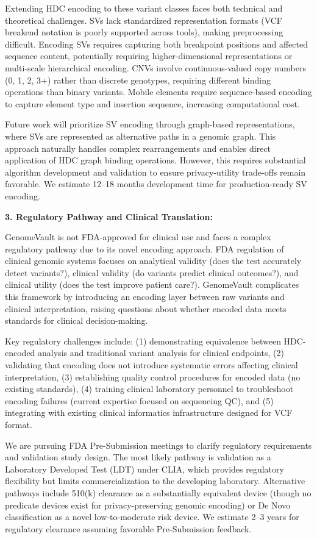 \documentclass[11pt,letterpaper]{article}
\begin{document}
Extending HDC encoding to these variant classes faces both technical and theoretical challenges. SVs lack standardized representation formats (VCF breakend notation is poorly supported across tools), making preprocessing difficult. Encoding SVs requires capturing both breakpoint positions and affected sequence content, potentially requiring higher-dimensional representations or multi-scale hierarchical encoding. CNVs involve continuous-valued copy numbers (0, 1, 2, 3+) rather than discrete genotypes, requiring different binding operations than binary variants. Mobile elements require sequence-based encoding to capture element type and insertion sequence, increasing computational cost.

Future work will prioritize SV encoding through graph-based representations, where SVs are represented as alternative paths in a genomic graph. This approach naturally handles complex rearrangements and enables direct application of HDC graph binding operations. However, this requires substantial algorithm development and validation to ensure privacy-utility trade-offs remain favorable. We estimate 12--18 months development time for production-ready SV encoding.

\textbf{3. Regulatory Pathway and Clinical Translation:}

GenomeVault is not FDA-approved for clinical use and faces a complex regulatory pathway due to its novel encoding approach. FDA regulation of clinical genomic systems focuses on analytical validity (does the test accurately detect variants?), clinical validity (do variants predict clinical outcomes?), and clinical utility (does the test improve patient care?). GenomeVault complicates this framework by introducing an encoding layer between raw variants and clinical interpretation, raising questions about whether encoded data meets standards for clinical decision-making.

Key regulatory challenges include: (1) demonstrating equivalence between HDC-encoded analysis and traditional variant analysis for clinical endpoints, (2) validating that encoding does not introduce systematic errors affecting clinical interpretation, (3) establishing quality control procedures for encoded data (no existing standards), (4) training clinical laboratory personnel to troubleshoot encoding failures (current expertise focused on sequencing QC), and (5) integrating with existing clinical informatics infrastructure designed for VCF format.

We are pursuing FDA Pre-Submission meetings to clarify regulatory requirements and validation study design. The most likely pathway is validation as a Laboratory Developed Test (LDT) under CLIA, which provides regulatory flexibility but limits commercialization to the developing laboratory. Alternative pathways include 510(k) clearance as a substantially equivalent device (though no predicate devices exist for privacy-preserving genomic encoding) or De Novo classification as a novel low-to-moderate risk device. We estimate 2--3 years for regulatory clearance assuming favorable Pre-Submission feedback.
\end{document}
